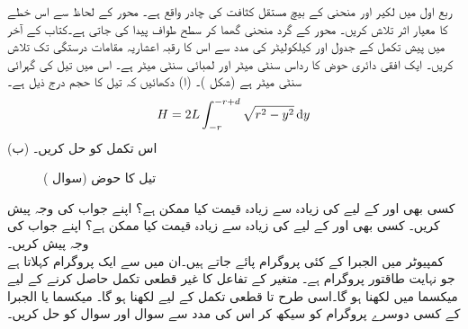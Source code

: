 ربع اول میں لکیر  اور منحنی  کے بیچ مستقل کثافت  کی چادر  واقع ہے۔ محور  کے لحاظ سے اس خطے کا معیار اثر تلاش کریں۔
محور  کے گرد منحنی  گھما کر سطح طواف پیدا کی جاتی ہے۔کتاب کے آخر میں پیش  تکمل  کے جدول اور کیلکولیٹر کی مدد سے اس کا رقبہ  اعشاریہ مقامات   درستگی تک تلاش کریں۔
ایک افقی دائری حوض کا رداس  سنٹی میٹر اور لمبائی  سنٹی میٹر ہے۔ اس میں تیل کی گہرائی  سنٹی میٹر ہے (شکل )۔ (ا) دکھائیں کہ تیل کا حجم درج ذیل ہے۔
\begin{align*}
H=2L\int_{-r}^{-r+d}\sqrt{r^2-y^2}\dif y
\end{align*}
(ب) اس تکمل کو حل کریں۔
\begin{figure}
\centering
{}
\caption{تیل کا حوض (سوال )}
\label{شکل_سوال_طریقہ_حوض_تیل}
\end{figure}

کسی بھی  اور  کے لیے  کی زیادہ سے زیادہ قیمت کیا ممکن ہے؟ اپنے جواب کی وجہ پیش کریں۔
کسی بھی  اور  کے لیے  کی زیادہ سے زیادہ قیمت کیا ممکن ہے؟ اپنے جواب کی وجہ پیش کریں۔
\\
 کمپیوٹر میں الجبرا کے کئی پروگرام پائے جاتے ہیں۔ان میں سے ایک پروگرام  کہلاتا ہے جو نہایت طاقتور پروگرام ہے۔ متغیر  کے تفاعل  کا غیر قطعی تکمل حاصل کرنے کے لیے میکسما میں  لکھنا ہو گا۔اسی طرح  تا  قطعی تکمل کے لیے  لکھنا ہو گا۔ میکسما یا الجبرا کے کسی دوسرے پروگرام کو سیکھ کر اس کی مدد   سے سوال  اور سوال  کو حل کریں۔

